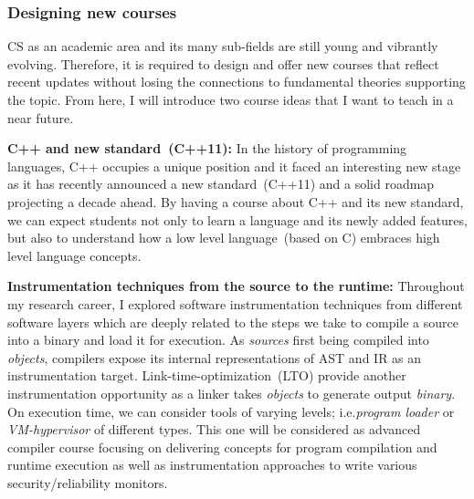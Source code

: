 \documentclass[letterpaper, 10pt]{article}
\def\ie{i.e.\xspace}
\begin{document}
\begin{small}
\subsubsection*{Designing new courses} 

CS as an academic area and its many sub-fields are still young and vibrantly
evolving. Therefore, it is required to design and offer new courses that
reflect recent updates without losing the connections to fundamental theories
supporting the topic. From here, I will introduce two course ideas that I want
to teach in a near future. 

{\bf C++ and new standard~(C++11):} In the history of programming languages,
C++ occupies a unique position and it faced an interesting new stage as it
has recently announced a new standard~(C++11) and a solid roadmap projecting a
decade ahead.
%
%
By having a course about C++ and its new standard, we can expect students not
only to learn a language and its newly added features, but also to understand
how a low level language~(based on C) embraces high level language concepts. 

{\bf Instrumentation techniques from the source to the runtime:} 
Throughout my research career, I explored software instrumentation techniques
from different software layers which are deeply related to the steps we take to
compile a source into a binary and load it for execution. 
%
As {\it sources} first being compiled into {\it objects}, compilers expose its
internal representations of AST and IR as an instrumentation target.
%
Link-time-optimization~(LTO) provide another instrumentation opportunity as a
linker takes {\it objects} to generate output {\it binary}. 
%
On execution time, we can consider tools of varying levels; \ie {\it program
loader} or {\it VM-hypervisor} of different types.
%
This one will be considered as  advanced compiler course focusing on delivering
concepts for program compilation and runtime execution as well as
instrumentation approaches to write various security/reliability monitors.


\end{small}
\end{document}
